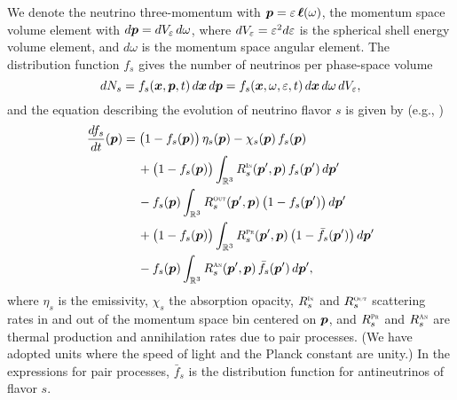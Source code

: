 \documentclass[12pt]{article}
\newcommand{\IN}{\mbox{\tiny{\sc In}}}
\newcommand{\OUT}{\mbox{\tiny{\sc Out}}}
\newcommand{\PROD}{\mbox{\tiny{\sc Pr}}}
\newcommand{\ANN}{\mbox{\tiny{\sc An}}}
\begin{document}
We denote the neutrino three-momentum with $\boldsymbol{p}=\varepsilon\,\boldsymbol{\ell}(\omega)$, the momentum space volume element with $d\boldsymbol{p}=dV_{\varepsilon}\,d\omega$, where $dV_{\varepsilon}=\varepsilon^{2}d\varepsilon$ is the spherical shell energy volume element, and $d\omega$ is the momentum space angular element.  
The distribution function $f_{s}$ gives the number of neutrinos per phase-space volume
\begin{equation}
  dN_{s}=f_{s}(\boldsymbol{x},\boldsymbol{p},t)\,d\boldsymbol{x}\,d\boldsymbol{p}
  =f_{s}(\boldsymbol{x},\omega,\varepsilon,t)\,d\boldsymbol{x}\,d\omega\,dV_{\varepsilon},
\end{equation}
and the equation describing the evolution of neutrino flavor $s$ is given by (e.g., \citep{bruenn_1985})
\begin{align}
  \deriv{f_{s}}{t}(\vect{p})
  & = \big(1-f_{s}(\vect{p})\big)\,\eta_{s}(\vect{p}) - \chi_{s}(\vect{p})\,f_{s}(\vect{p}) \nonumber \\
  & \hspace{12pt}
  +\big(1-f_{s}(\vect{p})\big)\int_{\bbR^{3}}R_{s}^{\IN}(\vect{p}',\vect{p})\,f_{s}(\vect{p}')\,d\vect{p}' \nonumber \\
  & \hspace{12pt}
  -f_{s}(\vect{p})\int_{\bbR^{3}}R_{s}^{\OUT}(\vect{p}',\vect{p})\,\big(1-f_{s}(\vect{p}')\big)\,d\vect{p}' \nonumber \\
  & \hspace{12pt}
  +\big(1-f_{s}(\vect{p})\big)\int_{\bbR^{3}}R_{s}^{\PROD}(\vect{p}',\vect{p})\,\big(1-\bar{f}_{s}(\vect{p}')\big)\,d\vect{p}' \nonumber \\
  & \hspace{12pt}
  -f_{s}(\vect{p})\int_{\bbR^{3}}R_{s}^{\ANN}(\vect{p}',\vect{p})\,\bar{f}_{s}(\vect{p}')\,d\vect{p}',
  \label{eq:homogeneousBoltzmann}
\end{align}
where $\eta_{s}$ is the emissivity, $\chi_{s}$ the absorption opacity, $R_{s}^{\IN}$ and $R_{s}^{\OUT}$ scattering rates in and out of the momentum space bin centered on $\boldsymbol{p}$, and $R_{s}^{\PROD}$ and $R_{s}^{\ANN}$ are thermal production and annihilation rates due to pair processes.  
(We have adopted units where the speed of light and the Planck constant are unity.)  
In the expressions for pair processes, $\bar{f}_{s}$ is the distribution function for antineutrinos of flavor $s$.  
\end{document}
